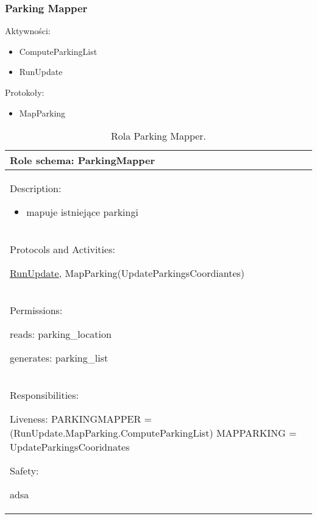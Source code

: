 \newpage
\subsubsection{Parking Mapper}

Aktywności:
\begin{itemize}
    \item ComputeParkingList
    \item RunUpdate

\end{itemize}

Protokoły:
\begin{itemize}
    \item MapParking
\end{itemize}


\begin{table}[!h] \label{tab:rola1} \centering
    \caption{Rola Parking Mapper.}
    \begin{tabular} {| p{14cm} |} \hline
        Role schema: ParkingMapper \\ \hline
        Description:

        \begin{itemize}
            \item mapuje istniejące parkingi
        \end{itemize} \\ \hline
        Protocols and Activities: 
        
        \ul{RunUpdate}, MapParking(UpdateParkingsCoordiantes) \\ \hline
        Permissions:

        reads: parking\_location

        generates:  parking\_list                                                                                 \\ \hline
        Responsibilities:

        Liveness: PARKINGMAPPER = (RunUpdate.MapParking.ComputeParkingList)
        MAPPARKING = UpdateParkingsCooridnates 
        

        Safety:

        \hspace{5mm} adsa                                                                                                                                     \\ \hline
    \end{tabular}
\end{table}

